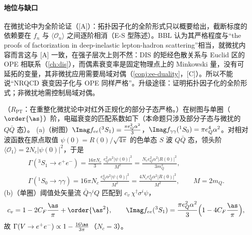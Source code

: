 \paragraph{地位与缺口}
在微扰论中为全阶论证（[A]）：拓扑因子化的全阶形式只以概要给出，截断标度的依赖要在 $f_n$ 与 $\langle\mathcal O_n\rangle$ 之间逐阶相消（E-S 型陈述）。BBL 认为其严格程度与“the proofs of factorization in deep-inelastic lepton-hadron scattering”相当\cite[第~VI.A~节]{BodwinBraatenLepage1995}，就微扰内容而言这与 [A] 一致，在强子层次上则不然：DIS 的矩经色散关系与 Euclid 区的 OPE 相联系（\cref{ch:dis}），而偶素衰变率是固定物理点上的 Minkowski 量，没有可延拓的变量，其非微扰应用需要局域对偶（\cref{conj:ee-duality}，[C]）。所以不能说“NRQCD 衰变因子化与 OPE 同样严格”。升级途径：证明拓扑因子化的全阶形式；非微扰地需控制局域对偶。

\begin{proposition}\label{prop:heavy-nrqcd-matching}
（$R_{\mathrm{PT}}$：在重整化微扰论中对红外正规化的部分子态严格。）在树图与单圈（$\order{\as}$）阶，电磁衰变的匹配系数如下（本命题只涉及部分子态与微扰的 $Q\bar Q$ 态）。
(a)（树图）$\Imag f_{ee}({}^3S_1)=\frac{\pi e_Q^2\alpha^2}{3}$，$\Imag f_{\gamma\gamma}({}^1S_0)=\pi e_Q^4\alpha^2$。对相对波函数在原点取值 $\psi(0)=R(0)/\sqrt{4\pi}$ 的色单态 $S$ 波 $Q\bar Q$ 态，领头阶 $\langle\mathcal O_1\rangle=2N_c|\psi(0)|^2$，于是
\begin{equation}\label{eq:heavy-EMwidths}
\begin{gathered}
\Gamma({}^3S_1\to e^+e^-)=\frac{16\pi N_c}{3}\,\frac{e_Q^2\alpha^2|\psi(0)|^2}{M^2}=\frac{N_ce_Q^2\alpha^2|R(0)|^2}{3m_Q^2},\\
\Gamma({}^1S_0\to\gamma\gamma)=16\pi N_c\,\frac{e_Q^4\alpha^2|\psi(0)|^2}{M^2}=\frac{4N_ce_Q^4\alpha^2|R(0)|^2}{M^2},\qquad M=2m_Q .
\end{gathered}
\end{equation}
(b)（单圈）阈值处矢量流 $\bar Q\gamma^iQ$ 匹配到 $c_v\,\chi^\dagger\sigma^i\psi$，
\begin{equation}\label{eq:heavy-cv}
c_v=1-2C_F\frac{\as}{\pi}+\order{\as^2},\qquad
\Imag f_{ee}({}^3S_1)=\frac{\pi e_Q^2\alpha^2}{3}\Big(1-4C_F\frac{\as}{\pi}\Big),
\end{equation}
故 $\Gamma(V\to e^+e^-)\propto1-\frac{16\as}{3\pi}$（$N_c=3$）。
\end{proposition}

